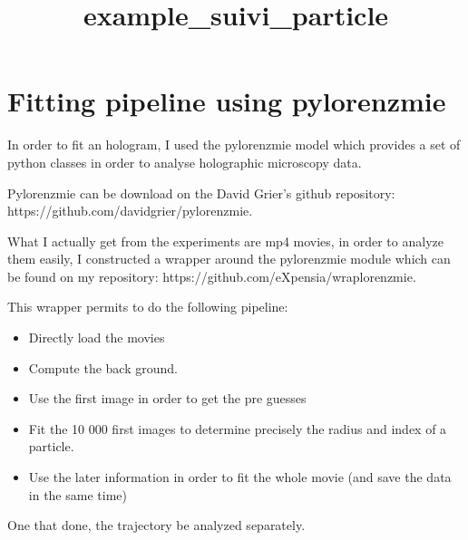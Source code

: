 \documentclass[12pt]{article}
\title{example\_suivi\_particle}
\providecommand{\tightlist}{%
      \setlength{\itemsep}{0pt}\setlength{\parskip}{0pt}}
\begin{document}
    
    
    

    
    \hypertarget{fitting-pipeline-using-pylorenzmie}{%
\section{Fitting pipeline using
pylorenzmie}\label{fitting-pipeline-using-pylorenzmie}}

In order to fit an hologram, I used the pylorenzmie model which provides
a set of python classes in order to analyse holographic microscopy data.

Pylorenzmie can be download on the David Grier's github repository:
https://github.com/davidgrier/pylorenzmie.

What I actually get from the experiments are mp4 movies, in order to
analyze them easily, I constructed a wrapper around the pylorenzmie
module which can be found on my repository:
https://github.com/eXpensia/wraplorenzmie.

This wrapper permits to do the following pipeline:

\begin{itemize}
\tightlist
\item
  Directly load the movies
\item
  Compute the back ground.
\item
  Use the first image in order to get the pre guesses
\item
  Fit the 10 000 first images to determine precisely the radius and
  index of a particle.
\item
  Use the later information in order to fit the whole movie (and save
  the data in the same time)
\end{itemize}

One that done, the trajectory be analyzed separately.
\end{document}
